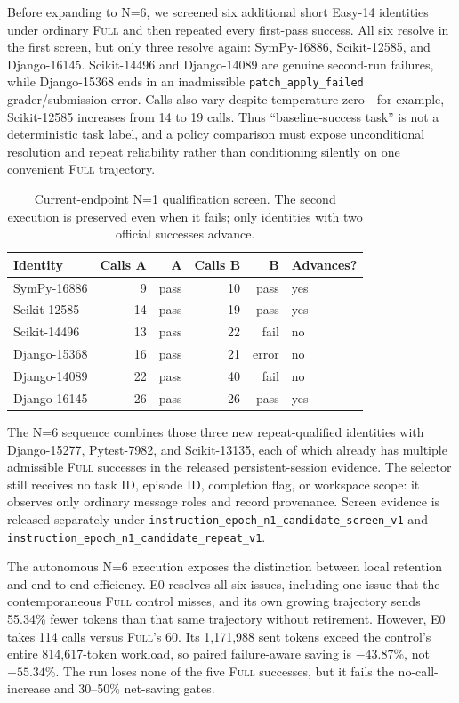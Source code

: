 \documentclass[11pt]{article}
\begin{document}
Before expanding to N=6, we screened six additional short Easy-14 identities
under ordinary \textsc{Full} and then repeated every first-pass success.  All six
resolve in the first screen, but only three resolve again: SymPy-16886,
Scikit-12585, and Django-16145.  Scikit-14496 and Django-14089 are genuine
second-run failures, while Django-15368 ends in an inadmissible
\texttt{patch\_apply\_failed} grader/submission error.  Calls also vary despite
temperature zero---for example, Scikit-12585 increases from 14 to 19 calls.
Thus ``baseline-success task'' is not a deterministic task label, and a policy
comparison must expose unconditional resolution and repeat reliability rather
than conditioning silently on one convenient \textsc{Full} trajectory.

\begin{table}[H]
\centering
\small
\caption{Current-endpoint N=1 qualification screen.  The second execution is
preserved even when it fails; only identities with two official successes
advance.}
\label{tab:instruction-epoch-n1-repeat-screen}
\begin{tabular}{lrrrrl}
\toprule
Identity & Calls A & A & Calls B & B & Advances? \\
\midrule
SymPy-16886 & 9 & pass & 10 & pass & yes \\
Scikit-12585 & 14 & pass & 19 & pass & yes \\
Scikit-14496 & 13 & pass & 22 & fail & no \\
Django-15368 & 16 & pass & 21 & error & no \\
Django-14089 & 22 & pass & 40 & fail & no \\
Django-16145 & 26 & pass & 26 & pass & yes \\
\bottomrule
\end{tabular}
\end{table}

The N=6 sequence combines those three new repeat-qualified identities with
Django-15277, Pytest-7982, and Scikit-13135, each of which already has multiple
admissible \textsc{Full} successes in the released persistent-session evidence.
The selector still receives no task ID, episode ID, completion flag, or
workspace scope: it observes only ordinary message roles and record
provenance.  Screen evidence is released separately under
\texttt{instruction\_epoch\_n1\_candidate\_screen\_v1} and
\texttt{instruction\_epoch\_n1\_candidate\_repeat\_v1}.

The autonomous N=6 execution exposes the distinction between local retention
and end-to-end efficiency.  E0 resolves all six issues, including one issue
that the contemporaneous \textsc{Full} control misses, and its own growing
trajectory sends 55.34\% fewer tokens than that same trajectory without
retirement.  However, E0 takes 114 calls versus \textsc{Full}'s 60.  Its
1,171,988 sent tokens exceed the control's entire 814,617-token workload, so
paired failure-aware saving is $-43.87$\%, not $+55.34$\%.  The run loses none
of the five \textsc{Full} successes, but it fails the no-call-increase and
30--50\% net-saving gates.
\end{document}
